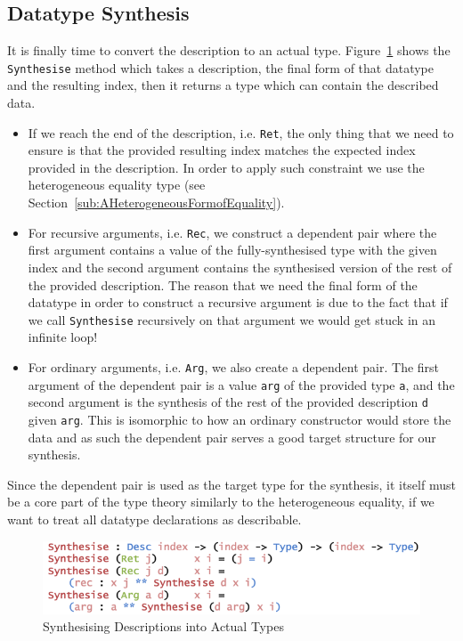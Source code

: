 \documentclass{ituthesis}
\begin{document}
\subsection{Datatype Synthesis}
\label{sub:DatatypeSynthesis}
It is finally time to convert the description to an actual type. Figure~\ref{fig:synthdata} shows the \texttt{Synthesise} method which takes a description, the final form of that datatype and the resulting index, then it returns a type which can contain the described data.

\begin{itemize}
  \item If we reach the end of the description, i.e. \texttt{Ret}, the only thing that we need to ensure is that the provided resulting index matches the expected index provided in the description. In order to apply such constraint we use the heterogeneous equality type (see Section~\ref{sub:AHeterogeneousFormofEquality}).
  \item For recursive arguments, i.e. \texttt{Rec}, we construct a dependent pair where the first argument contains a value of the fully-synthesised type with the given index and the second argument contains the synthesised version of the rest of the provided description. The reason that we need the final form of the datatype in order to construct a recursive argument is due to the fact that if we call \texttt{Synthesise} recursively on that argument we would get stuck in an infinite loop!
  \item For ordinary arguments, i.e. \texttt{Arg}, we also create a dependent pair. The first argument of the dependent pair is a value \texttt{arg} of the provided type \texttt{a}, and the second argument is the synthesis of the rest of the provided description \texttt{d} given \texttt{arg}. This is isomorphic to how an ordinary constructor would store the data and as such the dependent pair serves a good target structure for our synthesis.
\end{itemize}
Since the dependent pair is used as the target type for the synthesis, it itself must be a core part of the type theory similarly to the heterogeneous equality, if we want to treat all datatype declarations as describable.

\begin{figure}[ht]
\begin{center}
    \includegraphics[scale=0.5]{Figures/SynthesisingData.png}
\end{center}
\caption{Synthesising Descriptions into Actual Types}
\label{fig:synthdata}
\end{figure}
\end{document}
